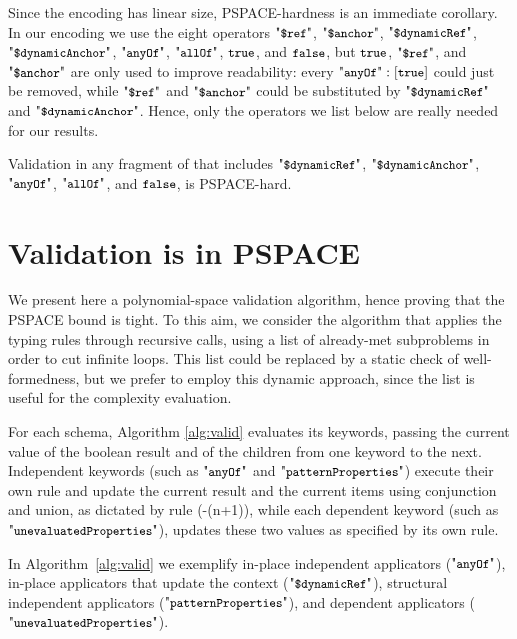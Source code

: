 Since the encoding has linear size, PSPACE-hardness is an immediate corollary.
In our encoding we use the eight operators $\qdref$, $\qda$, $\qddref$, 
$\qdda$,
$\qany$, $\qall$, $\mbox{\tt{\small true}}$, and $\mbox{\tt{\small false}}$, but $\mbox{\tt{\small true}}$, $\qdref$, and $\qda$ are only used to improve readability:
every $\qany: [ \atrue ]$ could just be removed, while $\qdref$ and $\qda$ could be substituted by
$\qddref$ and $\qdda$. Hence, only the operators we list below are really needed for our results.

\begin{corollary}
Validation in any fragment of {\mJS} that includes $\qddref$, $\qdda$,
$\qany$, $\qall$, and $\mbox{\tt{\small false}}$, is PSPACE-hard.
\end{corollary}


\section{Validation is in PSPACE}\label{sec:upperbound}


We present here a polynomial-space validation algorithm, hence proving that the PSPACE bound is tight. 
To this aim, we consider the algorithm that applies the typing rules through recursive calls,
using a list of already-met subproblems in order to cut infinite loops.
{This list could be replaced by a static check of well-formedness,
but we prefer to employ this dynamic approach, since the list is useful for the complexity evaluation.}

For each schema, Algorithm \ref{alg:valid} evaluates its keywords, passing the current value of the boolean result and of the
{\evaluated} children from one keyword to the next.
Independent
keywords (such as $\qany$ and $\qpattProps$) execute their own rule
and update the current result and the current {\evaluated}
items using conjunction and union, as dictated by rule (\rklist-(n+1)),
while each dependent keyword (such as $\qunProps$),
updates these two values as specified by its own rule.

In Algorithm~\ref{alg:valid} we exemplify in-place independent applicators ($\qany$),
 in-place applicators that update the context ($\qddref$),
 structural independent applicators ($\qpattProps$),
and  dependent applicators ($\qunProps$).




